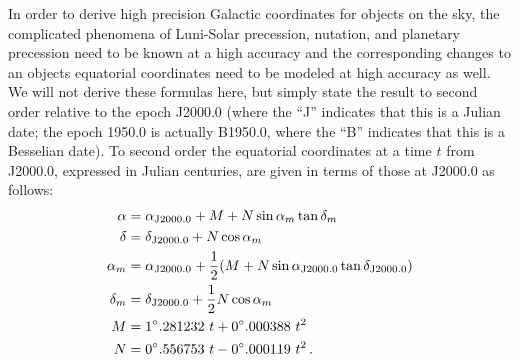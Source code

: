 In order to derive high precision Galactic coordinates for objects on
the sky, the complicated phenomena of Luni-Solar precession, nutation,
and planetary precession need to be known at a high accuracy and the
corresponding changes to an objects equatorial coordinates need to be
modeled at high accuracy as well. We will not derive these formulas
here, but simply state the result to second order \citep[as given
in][]{Green85a} relative to the epoch J2000.0 (where the ``J''
indicates that this is a Julian date; the epoch 1950.0 is actually
B1950.0, where the ``B'' indicates that this is a Besselian date). To
second order the equatorial coordinates at a time $t$ from J2000.0,
expressed in Julian centuries, are given in terms of those at J2000.0
as follows:
\begin{align}
\alpha & = \alpha_{\textnormal{J}2000.0} + M + N \sin \alpha_m \tan \delta_m\nonumber\\
\delta & = \delta_{\textnormal{J}2000.0} + N \cos \alpha_m\nonumber\\
\alpha_m & = \alpha_{\textnormal{J}2000.0} +\frac{1}{2} (M + N \sin \alpha_{\textnormal{J}2000.0} \tan \delta_{\textnormal{J}2000.0})\label{eq:radecJtoradect}\\
\delta_m & = \delta_{\textnormal{J}2000.0} + \frac{1}{2} N \cos \alpha_m\nonumber\\
M &= 1^{\circ}.281232 \ t + 0^{\circ}.000388 \ t^2\nonumber\\
N &= 0^{\circ}.556753 \ t - 0^{\circ}.000119 \ t^2\, . \nonumber
\end{align}

